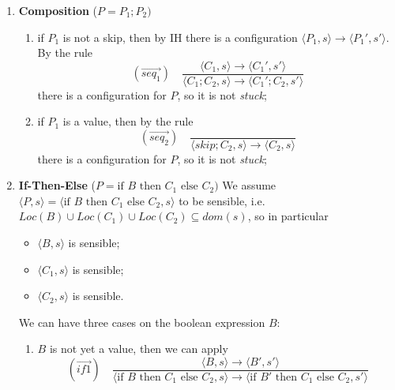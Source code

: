 \begin{solution}
\begin{enumerate}
\begin{enumerate}
\begin{enumerate}
\begin{enumerate}
                    \[ (\overset{\rightarrow}{set_2}) \quad \frac{}{\langle \ell:=n,s\rangle \to \langle skip, s[\ell \mapsto n]\rangle}\]
                    without the risk of a \textit{stuck} configuration, then there is a configuration for $P$, so it is not \textit{stuck};
                \end{enumerate}
                \item \textbf{Composition} ($P=P_1 ; P_2)$
                \begin{enumerate}
                    \item if $P_1$ is not a skip, then by IH there is a configuration $\langle P_1,s\rangle \to \langle P_1', s'\rangle$. By the rule 
                    \[ (\overset{\rightarrow}{seq_1}) \quad \frac{\langle C_1,s\rangle \to \langle C_1', s'\rangle}{\langle C_1;C_2,s\rangle \to \langle C_1';C_2, s'\rangle}\]
                    there is a configuration for $P$, so it is not \textit{stuck};
                    \item if $P_1$ is a value, then by the rule 
                    \[ (\overset{\rightarrow}{seq_2}) \quad \frac{}{\langle skip;C_2,s\rangle \to \langle C_2,s\rangle}\]
                    there is a configuration for $P$, so it is not \textit{stuck};
                \end{enumerate}
            \item \textbf{If-Then-Else} ($P=\text{if }B \text{ then } C_1 \text{ else }C_2)$
                We assume $\langle P,s\rangle = \langle \text{if }B \text{ then } C_1 \text{ else }C_2, s \rangle$ to be sensible, i.e. $Loc(B) \cup Loc(C_1) \cup Loc(C_2) \subseteq dom(s)$, so in particular 
                \begin{itemize}
                    \item $\langle B,s\rangle$ is sensible; 
                    \item $\langle C_1,s\rangle$ is sensible; 
                    \item $\langle C_2,s\rangle$ is sensible.
                \end{itemize}
                We can have three cases on the boolean expression $B$:
                \begin{enumerate}
                    \item $B$ is not yet a value, then we can apply 
                      \[ (\overset{\rightarrow}{if1}) \quad \frac{\langle B,s\rangle \to \langle B', s'\rangle}{\langle \text{if }B \text{ then }C_1 \text{ else }C_2, s\rangle \to \langle \text{if }B' \text{ then }C_1 \text{ else }C_2, s'\rangle}\]

\end{enumerate}
\end{enumerate}
\end{enumerate}
\end{enumerate}
\end{solution}
